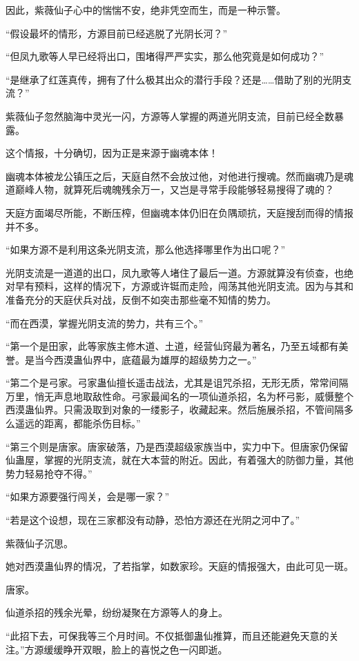 \begin{this_body}
因此，紫薇仙子心中的惴惴不安，绝非凭空而生，而是一种示警。

“假设最坏的情形，方源目前已经逃脱了光阴长河？”

“但凤九歌等人早已经将出口，围堵得严严实实，那么他究竟是如何成功？”

“是继承了红莲真传，拥有了什么极其出众的潜行手段？还是……借助了别的光阴支流？”

紫薇仙子忽然脑海中灵光一闪，方源等人掌握的两道光阴支流，目前已经全数暴露。

这个情报，十分确切，因为正是来源于幽魂本体！

幽魂本体被龙公镇压之后，天庭自然不会放过他，对他进行搜魂。然而幽魂乃是魂道巅峰人物，就算死后魂魄残余万一，又岂是寻常手段能够轻易搜得了魂的？

天庭方面竭尽所能，不断压榨，但幽魂本体仍旧在负隅顽抗，天庭搜刮而得的情报并不多。

“如果方源不是利用这条光阴支流，那么他选择哪里作为出口呢？”

光阴支流是一道道的出口，凤九歌等人堵住了最后一道。方源就算没有侦查，也绝对早有预料，这样的情况下，方源或许铤而走险，闯荡其他光阴支流。因为与其和准备充分的天庭伏兵对战，反倒不如突击那些毫不知情的势力。

“而在西漠，掌握光阴支流的势力，共有三个。”

“第一个是田家，此等家族主修木道、土道，经营仙窍最为著名，乃至五域都有美誉。是当今西漠蛊仙界中，底蕴最为雄厚的超级势力之一。”

“第二个是弓家。弓家蛊仙擅长遥击战法，尤其是诅咒杀招，无形无质，常常间隔万里，悄无声息地取敌性命。弓家最闻名的一项仙道杀招，名为杯弓影，威慑整个西漠蛊仙界。只需汲取到对象的一缕影子，收藏起来。然后施展杀招，不管间隔多么遥远的距离，都能杀伤目标。”

“第三个则是唐家。唐家破落，乃是西漠超级家族当中，实力中下。但唐家仍保留仙蛊屋，掌握的光阴支流，就在大本营的附近。因此，有着强大的防御力量，其他势力轻易抢夺不得。”

“如果方源要强行闯关，会是哪一家？”

“若是这个设想，现在三家都没有动静，恐怕方源还在光阴之河中了。”

紫薇仙子沉思。

她对西漠蛊仙界的情况，了若指掌，如数家珍。天庭的情报强大，由此可见一斑。

唐家。

仙道杀招的残余光晕，纷纷凝聚在方源等人的身上。

“此招下去，可保我等三个月时间。不仅抵御蛊仙推算，而且还能避免天意的关注。”方源缓缓睁开双眼，脸上的喜悦之色一闪即逝。


\end{this_body}
